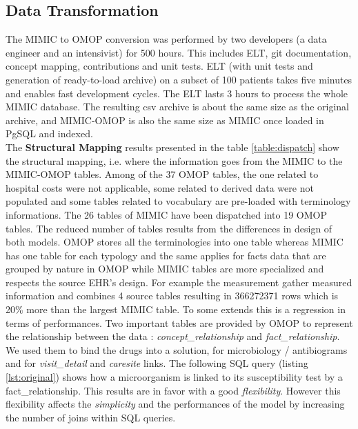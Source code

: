 %
% 
\subsection{Data Transformation}

%
%

The MIMIC to OMOP conversion was performed by two developers (a data engineer
and an intensivist) for 500 hours. This includes ELT, git documentation,
concept mapping, contributions and unit tests. ELT (with unit tests and
generation of ready-to-load archive) on a subset of 100 patients takes five
minutes and enables fast development cycles. The ELT lasts 3 hours to process
the whole MIMIC database. The resulting csv archive is about the same size as
the original archive, and MIMIC-OMOP is also the same size as MIMIC once loaded
in PgSQL and indexed.
\\

%
%
The \textbf{Structural Mapping} results presented in the table
\ref{table:dispatch} show the structural mapping, i.e. where the information
goes from the MIMIC to the MIMIC-OMOP tables. Among of the 37 OMOP tables, the
one related to hospital costs were not applicable, some related to derived data
were not populated and some tables related to vocabulary are pre-loaded with
terminology informations. The 26 tables of MIMIC have been dispatched into 19
OMOP tables. The reduced number of tables results from the differences in
design of both models. OMOP stores all the terminologies into one table whereas
MIMIC has one table for each typology and the same applies for facts data that
are grouped by nature in OMOP while MIMIC tables are more specialized and
respects the source EHR's design. For example the measurement gather measured
information and combines 4 source tables resulting in 366272371 rows which is
20\% more than the largest MIMIC table. To some extends this is a regression in
terms of performances.
Two important tables are provided by OMOP to represent the relationship between
the data : \textit{concept\_relationship} and \textit{fact\_relationship}. We
used them to bind the drugs into a solution, for microbiology / antibiograms
and for \textit{visit\_detail} and \textit{caresite} links. The following SQL
query (listing \ref{lst:original}) shows how a microorganism is linked to its
susceptibility test by a fact\_relationship. This results are in favor with a
good \textit{flexibility}. However this flexibility affects the
\textit{simplicity} and the performances of the model by increasing the number
of joins within SQL queries. 


